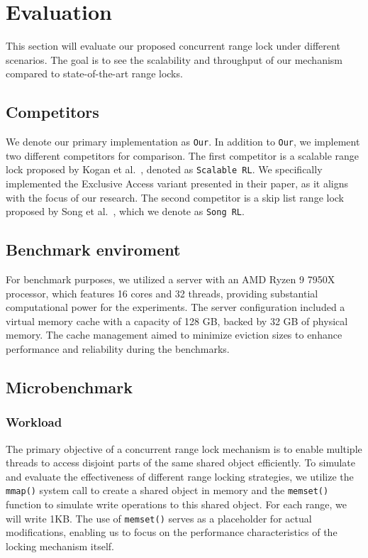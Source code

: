 \chapter{Evaluation}\label{chapter:evaluation}

This section will evaluate our proposed concurrent range lock under different scenarios. 
The goal is to see the scalability and throughput of our mechanism compared to state-of-the-art range locks.

\section{Competitors}

We denote our primary implementation as \texttt{Our}. 
In addition to \texttt{Our}, we implement two different competitors for comparison. 
The first competitor is a scalable range lock proposed by Kogan et al.~\parencite{kogan2020scalable}, denoted as \texttt{Scalable RL}. 
We specifically implemented the Exclusive Access variant presented in their paper, as it aligns with the focus of our research. 
The second competitor is a skip list range lock proposed by Song et al.~\parencite{song2013parallelizing}, which we denote as \texttt{Song RL}.

\section{Benchmark enviroment}

For benchmark purposes, we utilized a server with an AMD Ryzen 9 7950X processor, which features 16 cores and 32 threads, providing substantial computational power for the experiments. 
The server configuration included a virtual memory cache with a capacity of 128 GB, backed by 32 GB of physical memory. 
The cache management aimed to minimize eviction sizes to enhance performance and reliability during the benchmarks.

\section{Microbenchmark}\label{sec:microbenchmark}

\subsection{Workload}\label{subsec:workload}
The primary objective of a concurrent range lock mechanism is to enable multiple threads to access disjoint parts of the same shared object efficiently. 
To simulate and evaluate the effectiveness of different range locking strategies, we utilize the \texttt{mmap()} system call to create a shared object in memory and the \texttt{memset()} function to simulate write operations to this shared object. 
For each range, we will write 1KB. 
The use of \texttt{memset()} serves as a placeholder for actual modifications, enabling us to focus on the performance characteristics of the locking mechanism itself.

